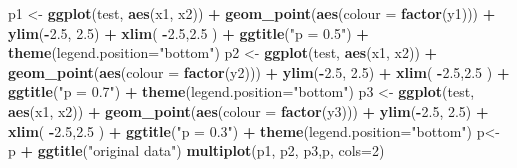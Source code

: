\documentclass[]{article}
\newenvironment{Shaded}{\begin{snugshade}}{\end{snugshade}}
\newcommand{\KeywordTok}[1]{\textcolor[rgb]{0.13,0.29,0.53}{\textbf{#1}}}
\newcommand{\DataTypeTok}[1]{\textcolor[rgb]{0.13,0.29,0.53}{#1}}
\newcommand{\DecValTok}[1]{\textcolor[rgb]{0.00,0.00,0.81}{#1}}
\newcommand{\FloatTok}[1]{\textcolor[rgb]{0.00,0.00,0.81}{#1}}
\newcommand{\StringTok}[1]{\textcolor[rgb]{0.31,0.60,0.02}{#1}}
\newcommand{\OperatorTok}[1]{\textcolor[rgb]{0.81,0.36,0.00}{\textbf{#1}}}
\newcommand{\NormalTok}[1]{#1}
\begin{document}
\begin{Shaded}
\begin{Highlighting}[]
\NormalTok{p1 <-}\StringTok{ }\KeywordTok{ggplot}\NormalTok{(test, }\KeywordTok{aes}\NormalTok{(x1, x2)) }\OperatorTok{+}\StringTok{ }\KeywordTok{geom_point}\NormalTok{(}\KeywordTok{aes}\NormalTok{(}\DataTypeTok{colour =} \KeywordTok{factor}\NormalTok{(y1))) }\OperatorTok{+}
\StringTok{  }\KeywordTok{ylim}\NormalTok{(}\OperatorTok{-}\FloatTok{2.5}\NormalTok{, }\FloatTok{2.5}\NormalTok{) }\OperatorTok{+}\StringTok{ }\KeywordTok{xlim}\NormalTok{( }\OperatorTok{-}\FloatTok{2.5}\NormalTok{,}\FloatTok{2.5}\NormalTok{ ) }\OperatorTok{+}\StringTok{ }\KeywordTok{ggtitle}\NormalTok{(}\StringTok{"p = 0.5"}\NormalTok{) }\OperatorTok{+}
\StringTok{  }\KeywordTok{theme}\NormalTok{(}\DataTypeTok{legend.position=}\StringTok{"bottom"}\NormalTok{)}
\NormalTok{p2 <-}\StringTok{ }\KeywordTok{ggplot}\NormalTok{(test, }\KeywordTok{aes}\NormalTok{(x1, x2)) }\OperatorTok{+}\StringTok{ }\KeywordTok{geom_point}\NormalTok{(}\KeywordTok{aes}\NormalTok{(}\DataTypeTok{colour =} \KeywordTok{factor}\NormalTok{(y2))) }\OperatorTok{+}
\StringTok{  }\KeywordTok{ylim}\NormalTok{(}\OperatorTok{-}\FloatTok{2.5}\NormalTok{, }\FloatTok{2.5}\NormalTok{) }\OperatorTok{+}\StringTok{ }\KeywordTok{xlim}\NormalTok{( }\OperatorTok{-}\FloatTok{2.5}\NormalTok{,}\FloatTok{2.5}\NormalTok{ ) }\OperatorTok{+}\StringTok{ }\KeywordTok{ggtitle}\NormalTok{(}\StringTok{"p = 0.7"}\NormalTok{) }\OperatorTok{+}
\StringTok{  }\KeywordTok{theme}\NormalTok{(}\DataTypeTok{legend.position=}\StringTok{"bottom"}\NormalTok{)}
\NormalTok{p3 <-}\StringTok{ }\KeywordTok{ggplot}\NormalTok{(test, }\KeywordTok{aes}\NormalTok{(x1, x2)) }\OperatorTok{+}\StringTok{ }\KeywordTok{geom_point}\NormalTok{(}\KeywordTok{aes}\NormalTok{(}\DataTypeTok{colour =} \KeywordTok{factor}\NormalTok{(y3))) }\OperatorTok{+}
\StringTok{  }\KeywordTok{ylim}\NormalTok{(}\OperatorTok{-}\FloatTok{2.5}\NormalTok{, }\FloatTok{2.5}\NormalTok{) }\OperatorTok{+}\StringTok{ }\KeywordTok{xlim}\NormalTok{( }\OperatorTok{-}\FloatTok{2.5}\NormalTok{,}\FloatTok{2.5}\NormalTok{ ) }\OperatorTok{+}\StringTok{ }\KeywordTok{ggtitle}\NormalTok{(}\StringTok{"p = 0.3"}\NormalTok{) }\OperatorTok{+}
\StringTok{  }\KeywordTok{theme}\NormalTok{(}\DataTypeTok{legend.position=}\StringTok{"bottom"}\NormalTok{)}
\NormalTok{p<-}\StringTok{ }\NormalTok{p }\OperatorTok{+}\StringTok{ }\KeywordTok{ggtitle}\NormalTok{(}\StringTok{"original data"}\NormalTok{) }
\KeywordTok{multiplot}\NormalTok{(p1, p2, p3,p,  }\DataTypeTok{cols=}\DecValTok{2}\NormalTok{)}
\end{Highlighting}
\end{Shaded}
\end{document}
